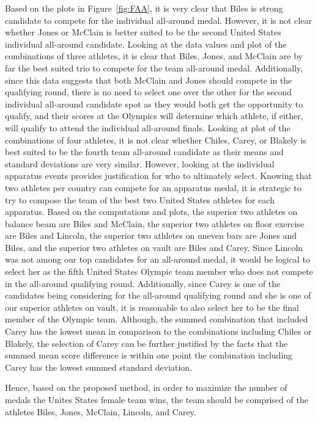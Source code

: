 \documentclass[12pt]{article}
\begin{document}
Based on the plots in Figure~\ref{fig:FAA}, it is very clear that Biles is strong candidate to 
compete for the individual all-around medal. However, it is not clear whether Jones or McClain is better suited 
to be the second United States individual all-around candidate. Looking at the data values and plot of the combinations of three athletes, 
it is clear that Biles, Jones, and McClain are by far the best suited trio to compete for the team all-around medal. 
Additionally, since this data suggests that both McClain and Jones should compete in the qualifying round, there 
is no need to select one over the other for the second individual all-around candidate spot as they would both get 
the opportunity to qualify, and their scores at the Olympics will determine which athlete, if either, will qualify 
to attend the individual all-around finals. Looking at plot of the combinations of four athletes, it is not clear whether Chiles, Carey, or 
Blakely is best suited to be the fourth team all-around candidate as their means and standard deviations are very 
similar. However, looking at the individual apparatus events provides justification for who to ultimately select. 
Knowing that two athletes per country can compete for an apparatus medal, it is strategic to try to compose the 
team of the best two United States athletes for each apparatus. Based on the computations and plots, the superior two 
athletes on balance beam are Biles and McClain, the superior two athletes on floor exercise are Biles and Lincoln, 
the superior two athletes on uneven bars are Jones and Biles, and the superior two athletes on vault are Biles 
and Carey. Since Lincoln was not among our top candidates for an all-around medal, it would be logical to select her 
as the fifth United States Olympic team member who does not compete in the all-around qualifying round. Additionally, 
since Carey is one of the candidates being considering for the all-around qualifying round and she is one of our superior 
athletes on vault, it is reasonable to also select her to be the final member of the Olympic team. Although, the 
summed combination that included Carey has the lowest mean in comparison to the combinations including Chiles or 
Blakely, the selection of Carey can be further justified by the facts that the summed mean score difference is 
within one point the combination including Carey has the lowest summed standard deviation.

Hence, based on the proposed method, in order to maximize the number of medals the Unites States female team wins, 
the team should be comprised of the athletes Biles, Jones, McClain, Lincoln, and Carey.
 
\end{document}
